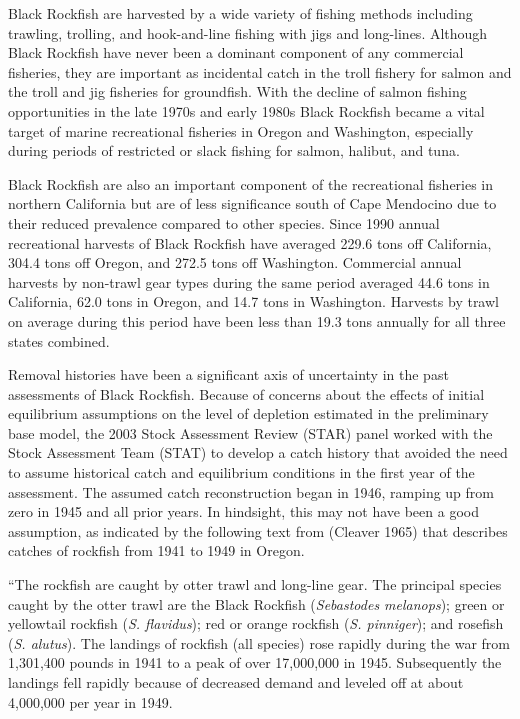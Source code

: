 \documentclass[11pt,
  english,
  letterpaper,
]{article}
\begin{document}
Black Rockfish are harvested by a wide variety of fishing methods including trawling, trolling, and hook-and-line fishing with jigs and long-lines. Although Black Rockfish have never been a dominant component of any commercial fisheries, they are important as incidental catch in the troll fishery for salmon and the troll and jig fisheries for groundfish. With the decline of salmon fishing opportunities in the late 1970s and early 1980s Black Rockfish became a vital target of marine recreational fisheries in Oregon and Washington, especially during periods of restricted or slack fishing for salmon, halibut, and tuna.

Black Rockfish are also an important component of the recreational fisheries in northern California but are of less significance south of Cape Mendocino due to their reduced prevalence compared to other species. Since 1990 annual recreational harvests of Black Rockfish have averaged 229.6 tons off California, 304.4 tons off Oregon, and 272.5 tons off Washington. Commercial annual harvests by non-trawl gear types during the same period averaged 44.6 tons in California, 62.0 tons in Oregon, and 14.7 tons in Washington. Harvests by trawl on average during this period have been less than 19.3 tons annually for all three states combined.

Removal histories have been a significant axis of uncertainty in the past assessments of Black Rockfish. Because of concerns about the effects of initial equilibrium assumptions on the level of depletion estimated in the preliminary base model, the 2003 Stock Assessment Review (STAR) panel worked with the Stock Assessment Team (STAT) to develop a catch history that avoided the need to assume historical catch and equilibrium conditions in the first year of the assessment. The assumed catch reconstruction began in 1946, ramping up from zero in 1945 and all prior years. In hindsight, this may not have been a good assumption, as indicated by the following text from (Cleaver 1965) that describes catches of rockfish from 1941 to 1949 in Oregon.

``The rockfish are caught by otter trawl and long-line gear. The principal species caught by the otter trawl are the Black Rockfish (\emph{Sebastodes melanops}); green or yellowtail rockfish (\emph{S. flavidus}); red or orange rockfish (\emph{S. pinniger}); and rosefish (\emph{S. alutus}). The landings of rockfish (all species) rose rapidly during the war from 1,301,400 pounds in 1941 to a peak of over 17,000,000 in 1945. Subsequently the landings fell rapidly because of decreased demand and leveled off at about 4,000,000 per year in 1949.
\end{document}
